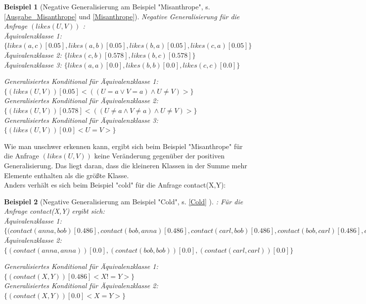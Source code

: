 \documentclass[a4paper, 11pt]{book}
\newtheorem{Bsp}{Beispiel}[section]
\begin{document}
\begin{Bsp}[Negative Generalisierung am Beispiel "{}Misanthrope"{}, s. \ref{Ausgabe_Misanthrope} und \ref{Misanthrope}]
	 Negative Generalisierung für die Anfrage  $ (likes(U,V))$ :\\
	
	\noindent
	Äquivalenzklasse 1: $ \{likes(a,c)[0.05], likes(a,b)[0.05], likes(b,a)[0.05], likes(c,a)[0.05]\} $\\
	Äquivalenzklasse 2: $ \{likes(c,b)[0.578], likes(b,c)[0.578]\} $\\
	Äquivalenzklasse 3: $ \{ likes(a,a)[0.0], likes(b,b)[0.0], likes(c,c)[0.0]\} $
	
	
	\noindent
		Generalisiertes Konditional für Äquivalenzklasse 1: $ \{(likes(U,V))[0.05] <((U = a \lor V = a) \land U \neq V )>\} $\\
		Generalisiertes Konditional für Äquivalenzklasse 2: $ \{(likes(U,V))[0.578] <((U \neq a \land V \neq a) \land U \neq V)>\} $\\	
		Generalisiertes Konditional für Äquivalenzklasse 3: $ \{(likes(U,V))[0.0] <U=V>\} $\\
	\end{Bsp}
Wie man unschwer erkennen kann, ergibt sich beim Beispiel "{}Misanthrope"{} für die Anfrage $ (likes(U,V))$  keine Veränderung gegenüber der positiven Generalisierung. Das liegt daran, dass die kleineren Klassen in der Summe mehr Elemente enthalten als die größte Klasse.\\ 
Anders verhält es sich beim Beispiel "{}cold"{} für die Anfrage contact(X,Y):
\begin{Bsp}[Negative Generalisierung am Beispiel "{}Cold"{}, s. \ref{Cold} ]:
	Für die Anfrage contact(X,Y) ergibt sich:\\
	
	\noindent
		Äquivalenzklasse 1: $ \{(contact(anna,bob)[0.486], contact(bob,anna)[0.486], contact(carl,bob)[0.486], contact(bob,carl)[0.486], contact(anna,carl)[0.486],contact(carl,anna)[0.486],\} $\\
	Äquivalenzklasse 2: $ \{(contact(anna,anna))[0.0], (contact(bob,bob))[0.0],(contact(carl, carl))[0.0]\} $

	\noindent
		Generalisiertes Konditional für Äquivalenzklasse 1: $ \{(contact(X,Y))[0.486]<X!=Y>\} $\\
	Generalisiertes Konditional für Äquivalenzklasse 2: $ \{(contact(X,Y))[0.0]<X=Y>\} $\\

\end{Bsp}
\end{document}
